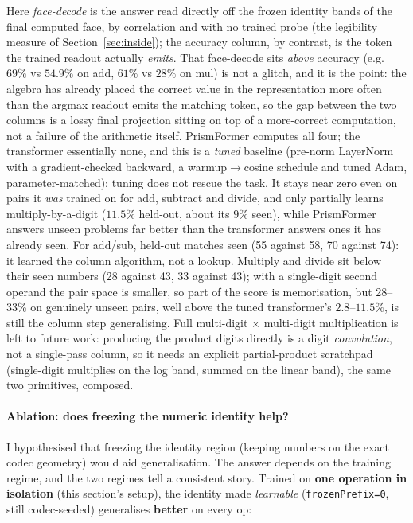 \documentclass[11pt]{article}
\newcommand{\code}[1]{\texttt{#1}}
\begin{document}
Here \emph{face-decode} is the answer read directly off the frozen identity bands of the final computed
face, by correlation and with no trained probe (the legibility measure of Section~\ref{sec:inside});
the accuracy column, by contrast, is the token the trained readout actually \emph{emits}. That
face-decode sits \emph{above} accuracy (e.g.\ $69\%$ vs $54.9\%$ on add, $61\%$ vs $28\%$ on mul) is not a
glitch, and it is the point: the algebra has already placed the correct value in the representation more
often than the argmax readout emits the matching token, so the gap between the two columns is a lossy
final projection sitting on top of a more-correct computation, not a failure of the arithmetic itself.
PrismFormer computes all four; the transformer essentially none, and this is a \emph{tuned} baseline
(pre-norm LayerNorm with a gradient-checked backward, a warmup$\to$cosine schedule and tuned Adam,
parameter-matched): tuning does not rescue the task. It stays near zero even on pairs it \emph{was}
trained on for add, subtract and divide, and only partially learns multiply-by-a-digit ($11.5\%$ held-out,
about its $9\%$ seen), while PrismFormer answers unseen problems far better than the transformer answers
ones it has already seen. For add/sub, held-out matches seen (55 against 58, 70 against 74): it learned the column
algorithm, not a lookup. Multiply and divide sit below their seen numbers (28 against 43, 33 against
43); with a single-digit second operand the pair space is smaller, so part of the score is
memorisation, but 28--33\% on genuinely unseen pairs, well above the tuned transformer's $2.8$--$11.5\%$,
is still the column step generalising. Full multi-digit $\times$ multi-digit multiplication is left to future work:
producing the product digits directly is a digit \emph{convolution}, not a single-pass column, so it
needs an explicit partial-product scratchpad (single-digit multiplies on the log band, summed on the
linear band), the same two primitives, composed.

\paragraph{Ablation: does freezing the numeric identity help?} I hypothesised that freezing the
identity region (keeping numbers on the exact codec geometry) would aid generalisation. The answer
depends on the training regime, and the two regimes tell a consistent story. Trained on \textbf{one
operation in isolation} (this section's setup), the identity made \emph{learnable}
(\code{frozenPrefix=0}, still codec-seeded) generalises \textbf{better} on every op:
\end{document}
